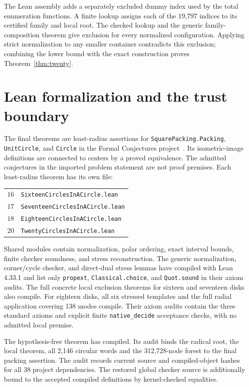 \documentclass[11pt]{amsart}
\theoremstyle{definition}
\theoremstyle{remark}
\begin{document}
The Lean assembly adds a separately excluded dummy index used by the
total enumeration functions. A finite lookup assigns each of the 19,797
indices to its certified family and local root. The checked lookup and
the generic family-composition theorem give exclusion for every normalized
configuration. Applying strict normalization to any smaller container
contradicts this exclusion; combining the lower bound with the exact
construction proves Theorem~\ref{thm:twenty}.

\section{Lean formalization and the trust boundary}\label{sec:lean}
The final theorems are least-radius assertions for
\texttt{SquarePacking.Packing}, \texttt{UnitCircle}, and
\texttt{Circle} in the Formal Conjectures project~\cite{formal}.
Its isometric-image definitions are connected to centers by a proved
equivalence. The admitted conjectures in the imported problem statement
are not proof premises. Each least-radius theorem has its own file:
\begin{center}\small
\begin{tabular}{@{}ll@{}}
$16$ & \texttt{SixteenCirclesInACircle.lean}\\
$17$ & \texttt{SeventeenCirclesInACircle.lean}\\
$18$ & \texttt{EighteenCirclesInACircle.lean}\\
$20$ & \texttt{TwentyCirclesInACircle.lean}
\end{tabular}
\end{center}
Shared modules contain normalization, polar ordering, exact interval bounds,
finite checker soundness, and stress reconstruction. The generic
normalization, corner/cycle checker, and direct-dual stress lemmas have
compiled with Lean 4.33.1 and list only \texttt{propext},
\texttt{Classical.choice}, and \texttt{Quot.sound} in their axiom audits.
The full concrete local exclusion theorems for sixteen and seventeen disks
also compile. For eighteen disks, all six stressed templates and the full
radial application covering 138 modes compile. Their axiom audits contain
the three standard axioms and explicit finite \texttt{native\_decide}
acceptance checks, with no admitted local premise.

The hypothesis-free theorem  has
compiled. Its audit binds the radical root, the local theorem, all 2,146
circular words and the 312,728-node forest to the final packing assertion.
The audit records current source and compiled-object hashes for all 38
project dependencies. The restored global checker source is additionally
bound to the accepted compiled definitions by kernel-checked equalities.
\end{document}

